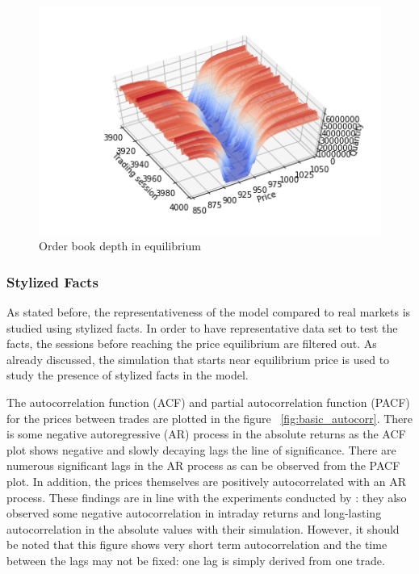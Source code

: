 \begin{figure}
    \includegraphics[width=\linewidth]{plots/basic_market_depth_in_equilibrium.png}
    \caption{Order book depth in equilibrium}
    \label{fig:basic_orderbook_evo}
\end{figure}


\subsubsection{Stylized Facts}
As stated before, the representativeness of the model compared to real markets 
is studied using stylized facts. In order to have representative data set to 
test the facts, the sessions before reaching the price equilibrium are filtered out. 
As already discussed, the simulation that starts near equilibrium price
is used to study the presence of stylized facts in the model. 

The autocorrelation function (ACF) and partial autocorrelation function (PACF) for the prices between
trades are plotted in the figure ~\ref{fig:basic_autocorr}. There is some negative autoregressive
(AR) process in the absolute returns as the ACF plot shows negative and slowly decaying lags 
the line of significance. There are numerous significant lags in the AR process as can be observed from 
the PACF plot. In addition, the prices themselves are positively autocorrelated with an AR process.
These findings are in line with the experiments conducted by \citet{Raberto05}: they also observed
some negative autocorrelation in intraday returns and long-lasting autocorrelation in the absolute
values with their simulation. However, it should be noted that this figure shows very short term
autocorrelation and the time between the lags may not be fixed: one lag is simply derived from one
trade. 


